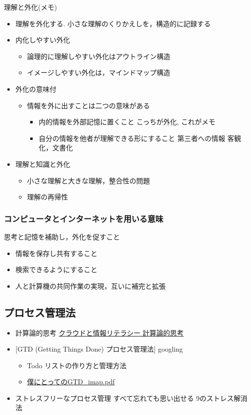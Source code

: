 \documentclass[dvipdfmx,11pat]{jarticle}
\begin{document}
理解と外化(メモ)  
\begin{itemize}
\item 理解を外化する. 小さな理解のくりかえしを，構造的に記録する
\item 内化しやすい外化
\begin{itemize}
\item 論理的に理解しやすい外化はアウトライン構造
\item イメージしやすい外化は，マインドマップ構造
\end{itemize}
\item 外化の意味付
\begin{itemize}
\item 情報を外に出すことは二つの意味がある
\begin{itemize}
\item 内的情報を外部記憶に置くこと
こっちが外化, これがメモ
\item 自分の情報を他者が理解できる形にすること
第三者への情報 客観化，文書化
\end{itemize}
\end{itemize}
\item 理解と知識と外化
\begin{itemize}
\item 小さな理解と大きな理解，整合性の問題
\item 理解の再帰性
\end{itemize}
\end{itemize}
\subsubsection{コンピュータとインターネットを用いる意味}
\label{sec:orgc6e2552}
思考と記憶を補助し，外化を促すこと
\begin{itemize}
\item 情報を保存し共有すること
\item 検索できるようにすること
\item 人と計算機の共同作業の実現，互いに補完と拡張
\end{itemize}
\subsection{プロセス管理法}
\label{sec:org85294e9}
\begin{itemize}
\item 計算論的思考 \href{https://masayuki054.github.io/cloud\_and\_information\_literacy/docs/computational\_thinking.html}{クラウドと情報リテラシー 計算論的思考}
\item {[}GTD (Getting Things Done) プロセス管理法] googling 
\begin{itemize}
\item Todo リストの作り方と管理方法
\item \href{https://masayuki054.github.io/cloud\_and\_information\_literacy/i\_maps/\%E5\%83\%95\%E3\%81\%AB\%E3\%81\%A8\%E3\%81\%A3\%E3\%81\%A6\%E3\%81\%AEGTD\_imap.pdf}{僕にとってのGTD\_imap.pdf}
\end{itemize}
\item ストレスフリーなプロセス管理 すべて忘れても思い出せる
9のストレス解消法
\end{itemize}
\end{document}
